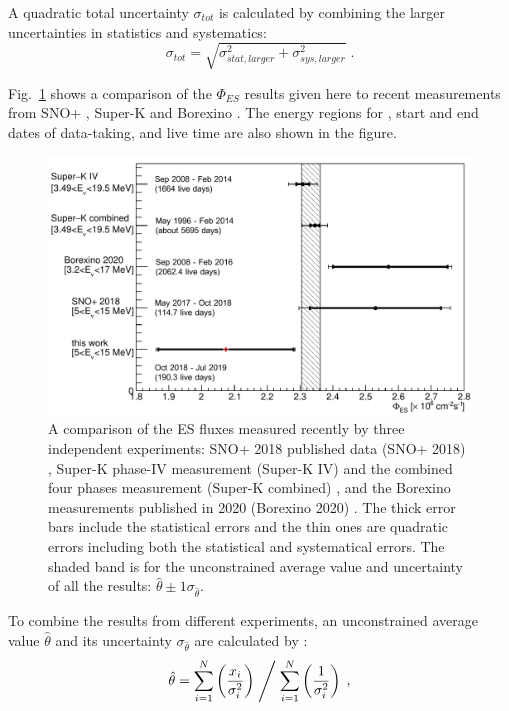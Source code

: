 A quadratic total uncertainty $\sigma_{tot}$ is calculated by combining the larger uncertainties in statistics and systematics:
\begin{equation}
\sigma_{tot}=\sqrt{\sigma^2_{stat,larger}+\sigma^2_{sys,larger}}\; .
\end{equation}

Fig.~\ref{fig:ESfluxCompare} shows a comparison of the $\Phi_{ES}$ results given here to recent measurements from SNO+ \cite{anderson2019measurement}, Super-K \cite{abe2016solar} and Borexino \cite{agostini2020improved}. The energy regions for , start and end dates of data-taking, and live time are also shown in the figure.
 
\begin{figure}[!htb]
	\centering
	\includegraphics[width=12cm]{ESfluxCompare.png}
	\caption[A comparison of the ES flux measured recently by three independent experiments.]{A comparison of the ES fluxes measured recently by three independent experiments: SNO+ 2018 published data (SNO+ 2018) \cite{anderson2019measurement}, Super-K phase-IV measurement (Super-K IV) and the combined four phases measurement (Super-K combined) \cite{abe2016solar}, and the Borexino measurements published in 2020 (Borexino 2020) \cite{agostini2020improved}. The thick error bars include the statistical errors and the thin ones are quadratic errors including both the statistical and systematical errors. The shaded band is for the unconstrained average value and uncertainty of all the results: $\hat \theta \pm 1\sigma_{\hat \theta}$.\label{fig:ESfluxCompare}}
\end{figure}

To combine the results from different experiments, an unconstrained average value $\hat \theta$ and its uncertainty $\sigma_{\hat\theta}$ are calculated by \cite{pdg2020,behnke2013data}:
\begin{equation}
\hat \theta = \sum_{i=1}^{N} \left(\frac{x_i}{\sigma_i^2}\right)\Biggm/\sum_{i=1}^{N}\left(\frac{1}{\sigma_i^2}\right)\; ,
\end{equation}

